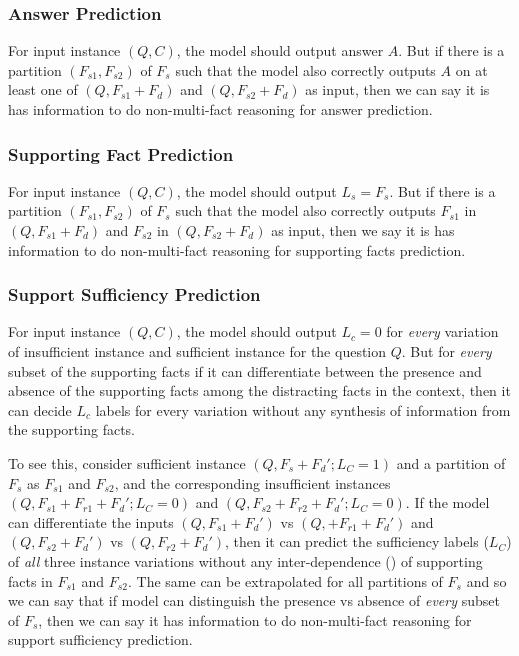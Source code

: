 \subsubsection{Answer Prediction}

For input instance $(Q, C)$, the model should output answer $A$. But if there is a partition $(F_{s1}, F_{s2})$ of $F_s$ such that the model also correctly outputs $A$ on at least one of $(Q, F_{s1} + F_d)$ and $(Q, F_{s2} + F_d)$ as input, then we can say it is has information to do non-multi-fact reasoning for answer prediction.

\subsubsection{Supporting Fact Prediction}

For input instance $(Q, C)$, the model should output $L_s = F_s$. But if there is a partition $(F_{s1}, F_{s2})$ of $F_s$ such that the model also correctly outputs $F_{s1}$ in $(Q, F_{s1} + F_d)$ and $F_{s2}$ in $(Q, F_{s2} + F_d)$ as input, then we say it is has information to do non-multi-fact reasoning for supporting facts prediction.

\subsubsection{Support Sufficiency Prediction}

For input instance $(Q, C)$, the model should output $L_c = 0$ for \textit{every} variation of insufficient instance and sufficient instance for the question $Q$. But for \textit{every} subset of the supporting facts if it can differentiate between the presence and absence of the supporting facts among the distracting facts in the context, then it can decide $L_c$ labels for every variation without any synthesis of information from the supporting facts.

To see this, consider sufficient instance $(Q, F_s + F_d'; L_C=1)$ and a partition of $F_s$ as $F_{s1}$ and $F_{s2}$, and the corresponding insufficient instances $(Q, F_{s1} + F_{r1} + F_d'; L_C=0)$ and $(Q, F_{s2} + F_{r2} + F_d'; L_C=0)$. If the model can differentiate the inputs $(Q, F_{s1} + F_d')$ vs $(Q, + F_{r1} + F_d')$ and $(Q, F_{s2} + F_d')$ vs $(Q, F_{r2} + F_d')$, then it can predict the sufficiency labels ($L_C$) of \textit{all} three instance variations without any inter-dependence () of supporting facts in $F_{s1}$ and $F_{s2}$. The same can be extrapolated for all partitions of $F_s$ and so we can say that if model can distinguish the presence vs absence of \textit{every} subset of $F_s$, then we can say it has information to do non-multi-fact reasoning for support sufficiency prediction.



